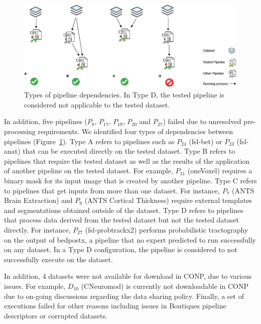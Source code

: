 \documentclass[conference]{IEEEtran}
\begin{document}
\begin{figure}[hbt!]
\centering%
\includegraphics[width=\textwidth]{figures/Pipeline Dependencies+.png}
\caption{Types of pipeline dependencies. In Type D, the tested pipeline 
is considered not applicable to the tested dataset. }
\label{fig:pipeline_dependencies}
\end{figure}
In addition, five pipelines ($P_{8}$, $P_{17}$, $P_{19}$, $P_{20}$ and
$P_{27}$) failed due to unresolved pre-processing requirements. We
identified four types of dependencies between pipelines
(Figure~\ref{fig:pipeline_dependencies}). Type A refers to pipelines such
as $P_{24}$ (fsl-bet) or $P_{23}$ (fsl-anat) that can be executed directly
on the tested dataset. Type B refers to pipelines that require the tested
dataset as well as the results of the application of another pipeline on
the tested dataset. For example, $P_{31}$ (oneVoxel) requires a binary mask
for its input image that is created by another pipeline. Type C refers
to pipelines that get inputs from more than one dataset. For instance, $P_7$
(ANTS Brain Extraction) and $P_9$ (ANTS Cortical Thickness) require
external templates and segmentations obtained outside of the dataset. Type
D refers to pipelines that process data derived from the tested dataset but not
the tested dataset directly.  For instance, $P_{27}$ (fsl-probtrackx2) performs
probabilistic tractography on the output of bedpostx, a pipeline that
no expert predicted to run successfully on any dataset. In a Type D
configuration, the pipeline is considered to not successfully execute on
the dataset. 

In addition, 4 datasets were not available for download in CONP, due to
various issues. For example, $D_{10}$ (CNeuromod) is currently not
downloadable in CONP due to on-going discussions regarding the data sharing policy.
Finally, a set of executions failed for other reasons including issues in
Boutiques pipeline descriptors or corrupted datasets.
\end{document}
